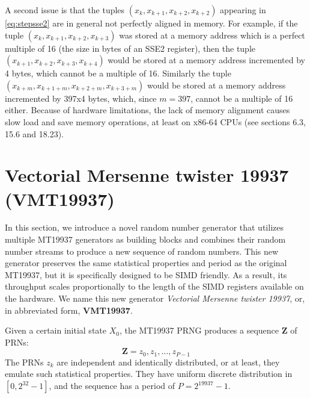 \documentclass[preprint,1p,times]{elsarticle}
\begin{document}
	A second issue is that the tuples $(x_k, x_{k+1}, x_{k+2}, x_{k+2})$ appearing in \eqref{eq:stepsse2} are in general not perfectly aligned in memory. For example, if the tuple $(x_k, x_{k+1}, x_{k+2}, x_{k+3})$ was stored at a memory address which is a perfect multiple of 16 (the size in bytes of an SSE2 register), then the tuple $(x_{k+1}, x_{k+2}, x_{k+3}, x_{k+4})$ would be stored at a memory address incremented by 4 bytes, which cannot be a multiple of 16. Similarly the tuple $(x_{k+m}, x_{k+1+m}, x_{k+2+m}, x_{k+3+m})$ would be stored at a memory address incremented by 397x4 bytes, which, since $m=397$, cannot be a multiple of 16 either. Because of hardware limitations, the lack of memory alignment causes slow load and save memory operations, at least on x86-64 CPUs (see \cite{intel} sections 6.3, 15.6 and 18.23).
	
	\section{Vectorial Mersenne twister 19937 (VMT19937)}
	\label{sec:simdgen}
	In this section, we introduce a novel random number generator that utilizes multiple MT19937 generators as building blocks and combines their random number streams to produce a new sequence of random numbers. This new generator preserves the same statistical properties and period as the original MT19937, but it is specifically designed to be SIMD friendly. As a result, its throughput scales proportionally to the length of the SIMD registers available on the hardware. We name this new generator \textit{Vectorial Mersenne twister 19937}, or, in abbreviated form, \textbf{VMT19937}.
	
	Given a certain initial state $X_0$, the MT19937 PRNG produces a sequence $\boldsymbol{Z}$ of PRNs:
	\begin{equation}
		\label{eq:mainseq}
		\boldsymbol{Z} = z_0, z_1, \dots, z_{P-1} 
	\end{equation}
	The PRNs $z_k$ are independent and identically distributed, or at least, they emulate such statistical properties. They have uniform discrete distribution in $[0, 2^{32}-1]$, and the sequence has a period of $P=2^{19937}-1$.
	
\end{document}
